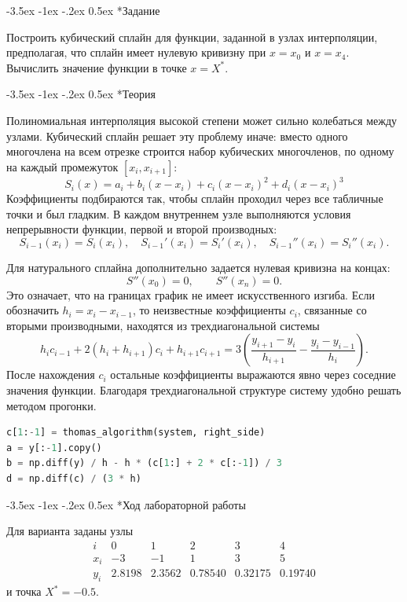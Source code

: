 \documentclass[14pt, a4paper]{article}
\makeatletter
\renewcommand\section{\@startsection {section}{1}{\parindent}%
  {-3.5ex \@plus -1ex \@minus -.2ex}%
  {0.5ex}%
  {\normalfont\Large\bfseries}}
\makeatother
\begin{document}
\section*{Задание}
Построить кубический сплайн для функции, заданной в узлах интерполяции, предполагая, что сплайн имеет нулевую кривизну при $x = x_0$ и $x = x_4$. Вычислить значение функции в точке $x = X^*$.

\section*{Теория}
Полиномиальная интерполяция высокой степени может сильно колебаться между узлами. Кубический сплайн решает эту проблему иначе: вместо одного многочлена на всем отрезке строится набор кубических многочленов, по одному на каждый промежуток $[x_i,x_{i+1}]$:
\[
    S_i(x)=a_i+b_i(x-x_i)+c_i(x-x_i)^2+d_i(x-x_i)^3
\]
Коэффициенты подбираются так, чтобы сплайн проходил через все табличные точки и был гладким. В каждом внутреннем узле выполняются условия непрерывности функции, первой и второй производных:
\[
    S_{i-1}(x_i)=S_i(x_i),\quad
    S_{i-1}'(x_i)=S_i'(x_i),\quad
    S_{i-1}''(x_i)=S_i''(x_i).
\]

Для натурального сплайна дополнительно задается нулевая кривизна на концах:
\[
    S''(x_0)=0,\qquad S''(x_n)=0.
\]
Это означает, что на границах график не имеет искусственного изгиба. Если обозначить $h_i=x_i-x_{i-1}$, то неизвестные коэффициенты $c_i$, связанные со вторыми производными, находятся из трехдиагональной системы
\[
    h_i c_{i-1}+2(h_i+h_{i+1})c_i+h_{i+1}c_{i+1}
    =3\left(\frac{y_{i+1}-y_i}{h_{i+1}}-\frac{y_i-y_{i-1}}{h_i}\right).
\]
После нахождения $c_i$ остальные коэффициенты выражаются явно через соседние значения функции. Благодаря трехдиагональной структуре систему удобно решать методом прогонки.

\begin{lstlisting}[language=Python]
c[1:-1] = thomas_algorithm(system, right_side)
a = y[:-1].copy()
b = np.diff(y) / h - h * (c[1:] + 2 * c[:-1]) / 3
d = np.diff(c) / (3 * h)
\end{lstlisting}

\section*{Ход лабораторной работы}
Для варианта заданы узлы
\[
\begin{array}{c|ccccc}
i&0&1&2&3&4\\\hline
x_i&-3&-1&1&3&5\\
y_i&2.8198&2.3562&0.78540&0.32175&0.19740
\end{array}
\]
и точка $X^*=-0.5$.
\end{document}
